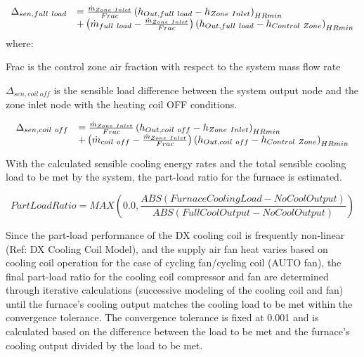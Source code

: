 \begin{equation}
  \begin{array}{rl}
    \Delta_{sen,full~load} &= \frac{\dot{m}_{Zone~Inlet}}{Frac} \left(h_{Out,full~load} - h_{Zone~Inlet}\right)_{HRmin} \\
                           &+ \left(\dot{m}_{full~load} - \frac{\dot{m}_{Zone~Inlet}}{Frac}\right) \left(h_{Out,full~load} - h_{Control~Zone}\right)_{HRmin}
  \end{array}
\end{equation}
where:

Frac is the control zone air fraction with respect to the system mass flow rate

\(\Delta_{sen,coil~off}\) is the sensible load difference between the system output node and the zone inlet node with the heating coil OFF conditions.

\begin{equation}
  \begin{array}{rl}
    \Delta_{sen,coil~off} &= \frac{\dot{m}_{Zone~Inlet}}{Frac} \left(h_{Out,coil~off} - h_{Zone~Inlet}\right)_{HRmin} \\
                           &+ \left(\dot{m}_{coil~off} - \frac{\dot{m}_{Zone~Inlet}}{Frac}\right) \left(h_{Out,coil~off} - h_{Control~Zone}\right)_{HRmin}
  \end{array}
\end{equation}

With the calculated sensible cooling energy rates and the total sensible cooling load to be met by the system, the part-load ratio for the furnace is estimated.

\begin{equation}
PartLoadRatio = MAX\left( {0.0,\frac{{ABS\left( {FurnaceCoolingLoad - NoCoolOutput} \right)}}{{ABS\left( {FullCoolOutput - NoCoolOutput} \right)}}} \right)
\label{eq:FurnacePartLoadRatio580}
\end{equation}

Since the part-load performance of the DX cooling coil is frequently non-linear (Ref: DX Cooling Coil Model), and the supply air fan heat varies based on cooling coil operation for the case of cycling fan/cycling coil (AUTO fan), the final part-load ratio for the cooling coil compressor and fan are determined through iterative calculations (successive modeling of the cooling coil and fan) until the furnace's cooling output matches the cooling load to be met within the convergence tolerance. The convergence tolerance is fixed at 0.001 and is calculated based on the difference between the load to be met and the furnace's cooling output divided by the load to be met.

